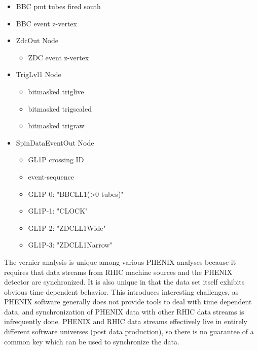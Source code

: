 \begin{itemize}
\begin{itemize}
\begin{itemize}
      \item BBC pmt tubes fired south
      \item BBC event z-vertex
    \end{itemize}
  \end{itemize}
  \begin{itemize}
  \item ZdcOut Node
    \begin{itemize}
      \item ZDC event z-vertex
    \end{itemize}
  \end{itemize}
  \begin{itemize}
  \item TrigLvl1 Node
    \begin{itemize}
      \item bitmasked triglive
      \item bitmasked trigscaled
      \item bitmasked trigraw
    \end{itemize}
  \end{itemize}  
  \begin{itemize}
  \item SpinDataEventOut Node
    \begin{itemize}
      \item GL1P crossing ID
      \item event-sequence
      \item GL1P-0: "BBCLL1(\textgreater0 tubes)"
      \item GL1P-1: "CLOCK"
      \item GL1P-2: "ZDCLL1Wide"
      \item GL1P-3: "ZDCLL1Narrow"
    \end{itemize}
  \end{itemize}  
\end{itemize}

The vernier analysis is unique among various PHENIX analyses because it requires
that data streams from RHIC machine sources and the PHENIX detector are
synchronized. It is also unique in that the data set itself exhibits obvious
time dependent behavior. This introduces interesting challenges, as PHENIX
software generally does not provide tools to deal with time dependent data, and
synchronization of PHENIX data with other RHIC data streams is infrequently
done. PHENIX and RHIC data streams effectively live in entirely different
software universes (post data production), so there is no guarantee of a common
key which can be used to synchronize the data. 

